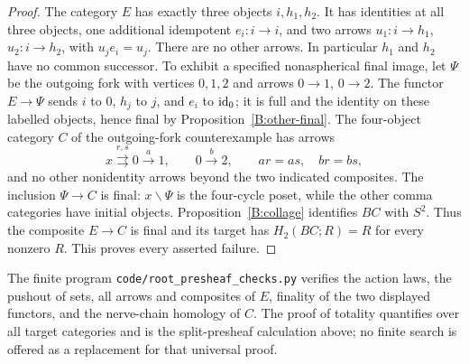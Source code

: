 \begin{proof}
The category $E$ has exactly three objects $i,h_1,h_2$. It has identities at all three objects, one additional idempotent $e_i:i\to i$, and two arrows $u_1:i\to h_1$, $u_2:i\to h_2$, with $u_je_i=u_j$. There are no other arrows. In particular $h_1$ and $h_2$ have no common successor. To exhibit a specified nonaspherical final image, let $\Psi$ be the outgoing fork with vertices $0,1,2$ and arrows $0\to1$, $0\to2$. The functor $E\to\Psi$ sends $i$ to $0$, $h_j$ to $j$, and $e_i$ to $\mathrm{id}_0$; it is full and the identity on these labelled objects, hence final by Proposition~\ref{B:other-final}. The four-object category $C$ of the outgoing-fork counterexample has arrows
\[
 x\overset{r,s}{\rightrightarrows}0\xrightarrow{a}1,
 \qquad 0\xrightarrow{b}2,
 \qquad ar=as,\quad br=bs,
\]
and no other nonidentity arrows beyond the two indicated composites. The inclusion $\Psi\to C$ is final: $x\backslash\Psi$ is the four-cycle poset, while the other comma categories have initial objects. Proposition~\ref{B:collage} identifies $BC$ with $S^2$. Thus the composite $E\to C$ is final and its target has $H_2(BC;R)=R$ for every nonzero $R$. This proves every asserted failure.
\end{proof}

The finite program \texttt{code/root\_presheaf\_checks.py} verifies the action laws, the pushout of sets, all arrows and composites of $E$, finality of the two displayed functors, and the nerve-chain homology of $C$. The proof of totality quantifies over all target categories and is the split-presheaf calculation above; no finite search is offered as a replacement for that universal proof.

